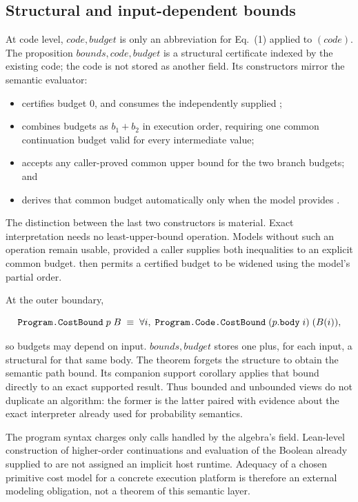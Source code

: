 \subsection{Structural and input-dependent bounds}

At code level, \(
\mathit{code},\mathit{budget}\) is only an
abbreviation for Eq.~(1) applied to \((\mathit{code})\).  The proposition
\(
\mathit{bounds},\mathit{code},\mathit{budget}\) is a structural certificate
indexed by the existing code; the code is not stored as another field.  Its
constructors mirror the semantic evaluator:

\begin{itemize}
  \item {} certifies budget \(0\), and  consumes
    the independently supplied ;
  \item {} combines budgets as \(b_1+b_2\) in execution order,
    requiring one common continuation budget valid for every intermediate
    value;
  \item {} accepts any caller-proved common upper
    bound for the two branch budgets; and
  \item {} derives that common budget automatically only
    when the model provides .
\end{itemize}

The distinction between the last two constructors is material.  Exact
interpretation needs no least-upper-bound operation.  Models without such an
operation remain usable, provided a caller supplies both inequalities to an
explicit common budget.   then permits a certified budget
to be widened using the model's partial order.

At the outer boundary,

\[
  \decl{Program.CostBound}\;p\;B
  \;\equiv\;
  \forall i,\;
    \decl{Program.Code.CostBound}\;(p.\decl{body}\;i)\;(B(i)),
\]

so budgets may depend on input.  \(
\mathit{bounds},\mathit{budget}\) stores
one  plus, for each input, a structural  for
that same body.  The theorem  forgets the
structure to obtain the semantic path bound.  Its companion support corollary
applies that bound directly to an exact supported result.  Thus bounded and
unbounded views do not duplicate an algorithm: the former is the latter paired
with evidence about the exact interpreter already used for probability
semantics.

\begin{scopeboundary}
The program syntax charges only calls handled by the algebra's 
field.
Lean-level construction of higher-order continuations and evaluation of the
Boolean already supplied to  are not assigned an implicit host
runtime.  Adequacy of a chosen primitive cost model for a concrete execution
platform is therefore an external modeling obligation, not a theorem of this
semantic layer.
\end{scopeboundary}
